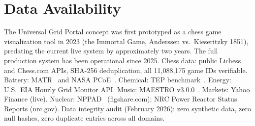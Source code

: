 \documentclass[12pt,a4paper]{article}
\begin{document}
\section{Data Availability}

The Universal Grid Portal concept was first prototyped as a chess game visualization tool in 2023
(the Immortal Game, Anderssen vs.\ Kieseritzky 1851), predating the current live system by approximately
two years. The full production system has been operational since 2025.
Chess data: public Lichess and Chess.com APIs, SHA-256 deduplication, all 11,088,175 game IDs
verifiable. Battery: MATR~\cite{severson2019} and NASA PCoE~\cite{nasa2007}. Chemical: TEP
benchmark~\cite{tep1993}. Energy: U.S.\ EIA Hourly Grid Monitor API. Music: MAESTRO
v3.0.0~\cite{maestro2019}. Markets: Yahoo Finance (live). Nuclear: NPPAD~\cite{nppad2022}
(figshare.com); NRC Power Reactor Status Reports (nrc.gov). Data integrity audit (February 2026):
zero synthetic data, zero null hashes, zero duplicate entries across all domains.
\end{document}
